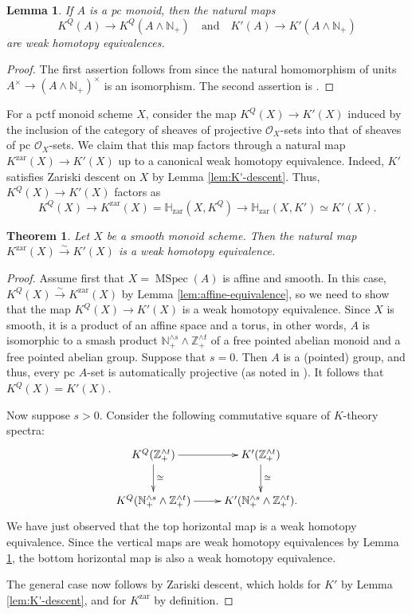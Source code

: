 \documentclass[12pt]{amsart}
\def\zar{{\mathrm{zar}}}
\def\Kzar{K^{\mathrm{zar}}}
\def\KQ{K^Q}
\newcommand{\bbH}{\mathbb H}
\newcommand{\Z}{\mathbb{Z}}
\newcommand{\N}{\mathbb{N}}
\def\MSpec{\operatorname{MSpec}}
\numberwithin{equation}{section}
\theoremstyle{plain}
\newtheorem{thm}[equation]{Theorem}
\newtheorem{lem}[equation]{Lemma}
\theoremstyle{definition}
\theoremstyle{remark}
\begin{document}
\begin{lem}\label{lem:K-htpy-invariance}
	If $A$ is a pc monoid, then the natural maps
	 \[\KQ(A)\to \KQ(A\wedge \N_+)\quad\text{and}\quad K'(A)\to K'(A\wedge \N_+)\]
	 are weak homotopy equivalences. 
\end{lem}

\begin{proof}
	The first assertion follows from \cite[Thm.\,2.6]{ELY} since the natural homomorphism of units $A^\times \to \left(A\wedge \N_+\right)^\times$ is an isomorphism. The second assertion is \cite[Thm.\,4.6]{HW}.
\end{proof}
 For a pctf monoid scheme $X$, consider the map
$\KQ(X)\to K'(X)$ induced by the inclusion of the category of
sheaves of projective $\mathcal{O}_X$-sets into that of
sheaves of pc $\mathcal{O}_X$-sets. We claim that this map factors through a natural map $\Kzar(X)\to K'(X)$
up to a canonical weak homotopy equivalence. Indeed, $K'$
satisfies Zariski descent on $X$ by Lemma \ref{lem:K'-descent}. Thus, $\KQ(X)\to K'(X)$
factors as
\[  \KQ(X)\to \Kzar(X) = \bbH_{\zar}(X, \KQ) \to \bbH_{\zar}(X, K')\simeq K'(X).   \]


\begin{thm}\label{thm:K-vs-K'}
	Let $X$ be a smooth monoid scheme. Then the natural map
 $\Kzar (X)\xrightarrow{\sim} K'(X)$ is a weak homotopy equivalence.
\end{thm}

\begin{proof}	
	 Assume first that $X = \MSpec (A)$ is affine and smooth. In this case, $\KQ(X)\xrightarrow{\sim} \Kzar(X)$ by Lemma \ref{lem:affine-equivalence}, so we need to show that the map $\KQ(X)\to K'(X)$ is a weak homotopy equivalence. Since $X$ is smooth, it is a product of an affine space and a torus, in other words, $A$ is isomorphic to a smash product $\N_+^{\wedge s} \wedge \Z_+^{\wedge t}$  of a
	free pointed abelian monoid and a free pointed abelian group. Suppose that $s = 0$. Then $A$ is a (pointed) group, and thus, every pc $A$-set is automatically projective (as noted in \cite[Ex.\,1.4]{HW}). It follows that $\KQ(X) = K'(X)$.
	
	 Now suppose $s > 0$. Consider the following commutative square of $K$-theory spectra:
		\begin{equation}\label{cart-square}
		\xymatrix{
			\KQ(\Z_+^{\wedge t})  \ar[r]\ar[d]^{\cong}&
			K'(\Z_+^{\wedge t}) \ar[d]^{\cong} 
			\\
			\KQ(\N_+^{\wedge s} \wedge \Z_+^{\wedge t})  \ar[r]& K'(\N_+^{\wedge s} \wedge \Z_+^{\wedge t}).
		}
	\end{equation}
	We have just observed that the top horizontal map is a weak homotopy equivalence. Since the
	 vertical maps are weak homotopy equivalences by Lemma \ref{lem:K-htpy-invariance}, the bottom horizontal map is also a weak homotopy equivalence. 
	
	The general case now follows by Zariski descent, which holds for $K'$ by Lemma \ref{lem:K'-descent}, and for $\Kzar$ by definition.
\end{proof}	
\end{document}

